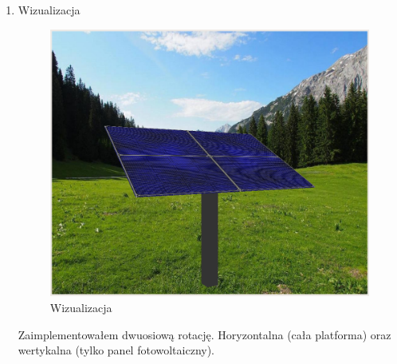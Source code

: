 \documentclass[10pt, a4paper]{article}
\begin{document}
\begin{enumerate}
			\item Wizualizacja
				\begin{figure}[H]
					\centering
					\includegraphics[width=1.0\textwidth]{figures/wizualizacja.png}
					\caption{Wizualizacja}
					\label{fig:wizualizacja}
				\end{figure}
			Zaimplementowałem dwuosiową rotację. Horyzontalna (cała platforma) oraz wertykalna (tylko panel fotowoltaiczny).
		\end{enumerate}
\end{document}
